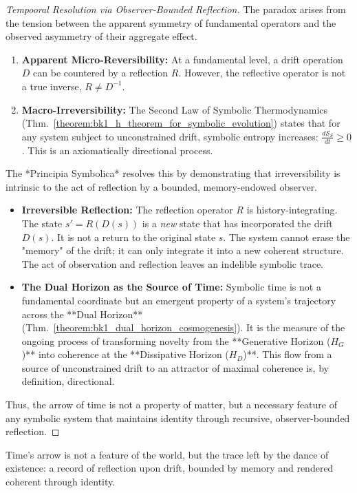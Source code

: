 \begin{proof}[Tempooral Resolution via Observer-Bounded Reflection]
\label{proof:bk4_temporal_resolution_via_observer_bounded_reflection}
The paradox arises from the tension between the apparent symmetry of fundamental operators and the observed asymmetry of their aggregate effect.
\begin{enumerate}
    \item \textbf{Apparent Micro-Reversibility:} At a fundamental level, a drift operation $D$ can be countered by a reflection $R$. However, the reflective operator is not a true inverse, $R \neq D^{-1}$.
    \item \textbf{Macro-Irreversibility:} The Second Law of Symbolic Thermodynamics (Thm.~\ref{theorem:bk1_h_theorem_for_symbolic_evolution}) states that for any system subject to unconstrained drift, symbolic entropy increases: $\frac{d\mathcal{S}_S}{dt} \geq 0$. This is an axiomatically directional process.
\end{enumerate}
The *Principia Symbolica* resolves this by demonstrating that irreversibility is intrinsic to the act of reflection by a bounded, memory-endowed observer.
\begin{itemize}
    \item \textbf{Irreversible Reflection:} The reflection operator $R$ is history-integrating. The state $s' = R(D(s))$ is a \emph{new} state that has incorporated the drift $D(s)$. It is not a return to the original state $s$. The system cannot erase the "memory" of the drift; it can only integrate it into a new coherent structure. The act of observation and reflection leaves an indelible symbolic trace.
    \item \textbf{The Dual Horizon as the Source of Time:} Symbolic time is not a fundamental coordinate but an emergent property of a system's trajectory across the **Dual Horizon** (Thm.~\ref{theorem:bk1_dual_horizon_cosmogenesis}). It is the measure of the ongoing process of transforming novelty from the **Generative Horizon ($H_G$)** into coherence at the **Dissipative Horizon ($H_D$)**. This flow from a source of unconstrained drift to an attractor of maximal coherence is, by definition, directional.
\end{itemize}
Thus, the arrow of time is not a property of matter, but a necessary feature of any symbolic system that maintains identity through recursive, observer-bounded reflection.
\end{proof}

\begin{scholium}
\label{scholium:bk4_irreversibility_as_trace}
Time’s arrow is not a feature of the world, but the trace left by the dance of existence: a record of reflection upon drift, bounded by memory and rendered coherent through identity.
\end{scholium}

